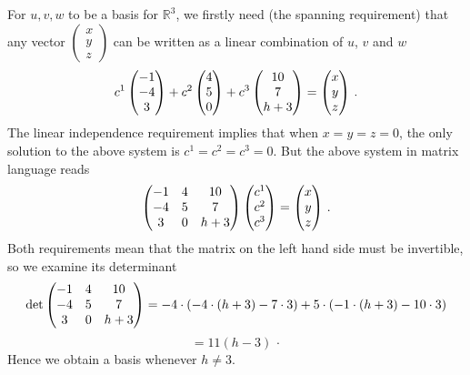 \begin{enumerate}
For $u,v,w$ to be a basis for ${\mathbb R}^3$, we firstly need  (the spanning requirement) that any vector $\begin{pmatrix}x \\ y \\ z\end{pmatrix}$ can be written
as a linear combination of $u$, $v$ and $w$
\[
c^1 \begin{pmatrix}-1 \\ -4 \\ 3\end{pmatrix} + c^2 \begin{pmatrix}4 \\ 5 \\ 0\end{pmatrix} + c^3 \begin{pmatrix}\mc{10} \\ \mc{7} \\ h+3\end{pmatrix} = \begin{pmatrix}x \\ y \\ z\end{pmatrix}\, .
\]
The linear independence requirement implies that when $x=y=z=0$, the only solution to the above system is $c^1=c^2=c^3=0$.
But the above system in matrix language reads
\[
\begin{pmatrix}
-1 &4 &\mc{10} \\ -4 & 5 &\mc{7} \\ 3 & 0 & h+3
\end{pmatrix}
\begin{pmatrix}c^1 \\ c^2 \\ c^3\end{pmatrix}=\begin{pmatrix}x \\ y \\ z\end{pmatrix}\, .
\]
Both requirements mean that the matrix on the left hand side must be invertible, so we examine its determinant
\[
{\rm det} \begin{pmatrix}
-1 &4 &\mc{10} \\ -4 & 5 &\mc{7} \\ 3 & 0 & h+3
\end{pmatrix}
= -4\cdot (-4\cdot(h+3)-7\cdot3)+ 5\cdot(-1\cdot(h+3)-10\cdot3)\] \[=11(h-3)\, \cdot
\]
Hence we obtain a basis whenever $h\neq 3$.

\end{enumerate}

\newpage
